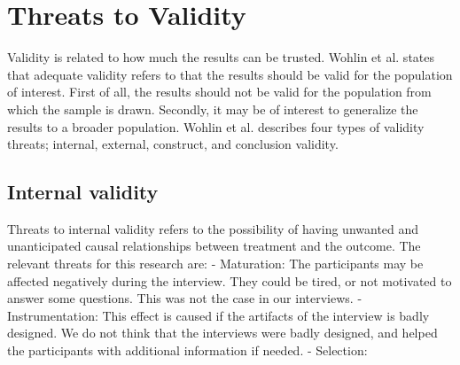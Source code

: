 




\section{Threats to Validity}
Validity is related to how much the results can be trusted\cite{Wohlin:2000:ESE:330775}. Wohlin et al.\cite{Wohlin:2000:ESE:330775} states that adequate validity refers to that the results should be valid for the population of interest. First of all, the results should not be valid for the population from which the sample is drawn. Secondly, it may be of interest to generalize the results to a broader population. Wohlin et al.\cite{Wohlin:2000:ESE:330775} describes four types of validity threats; internal, external, construct, and conclusion validity.

\subsection{Internal validity}
Threats to internal validity refers to the possibility of having unwanted and unanticipated causal relationships between treatment and the outcome. The relevant threats for this research are:
- Maturation: The participants may be affected negatively during the interview. They could be tired, or not motivated to answer some questions. This was not the case in our interviews.
- Instrumentation: This effect is caused if the artifacts of the interview is badly designed. We do not think that the interviews were badly designed, and helped the participants with additional information if needed.
- Selection: 


